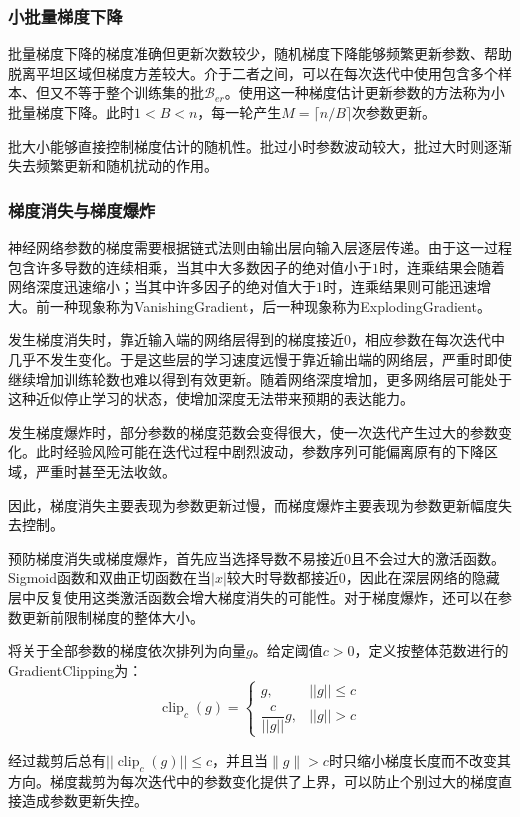 \subsubsection{小批量梯度下降}
批量梯度下降的梯度准确但更新次数较少，随机梯度下降能够频繁更新参数、帮助脱离平坦区域但梯度方差较大。介于二者之间，可以在每次迭代中使用包含多个样本、但又不等于整个训练集的批$\mathcal{B}_{er}$。使用这一种梯度估计更新参数的方法称为小批量梯度下降。此时$1<B<n$，每一轮产生$M=\lceil n/B\rceil$次参数更新。\par
批大小能够直接控制梯度估计的随机性。批过小时参数波动较大，批过大时则逐渐失去频繁更新和随机扰动的作用。
\subsubsection{梯度消失与梯度爆炸}
神经网络参数的梯度需要根据链式法则由输出层向输入层逐层传递。由于这一过程包含许多导数的连续相乘，当其中大多数因子的绝对值小于$1$时，连乘结果会随着网络深度迅速缩小；当其中许多因子的绝对值大于$1$时，连乘结果则可能迅速增大。前一种现象称为\gls{VanishingGradient}，后一种现象称为\gls{ExplodingGradient}。\par
发生梯度消失时，靠近输入端的网络层得到的梯度接近$0$，相应参数在每次迭代中几乎不发生变化。于是这些层的学习速度远慢于靠近输出端的网络层，严重时即使继续增加训练轮数也难以得到有效更新。随着网络深度增加，更多网络层可能处于这种近似停止学习的状态，使增加深度无法带来预期的表达能力。\par
发生梯度爆炸时，部分参数的梯度范数会变得很大，使一次迭代产生过大的参数变化。此时经验风险可能在迭代过程中剧烈波动，参数序列可能偏离原有的下降区域，严重时甚至无法收敛。\par
因此，梯度消失主要表现为参数更新过慢，而梯度爆炸主要表现为参数更新幅度失去控制。\par
预防梯度消失或梯度爆炸，首先应当选择导数不易接近$0$且不会过大的激活函数。Sigmoid函数和双曲正切函数在当$|x|$较大时导数都接近$0$，因此在深层网络的隐藏层中反复使用这类激活函数会增大梯度消失的可能性。对于梯度爆炸，还可以在参数更新前限制梯度的整体大小。
\begin{definition}
	将关于全部参数的梯度依次排列为向量$g$。给定阈值$c>0$，定义按整体范数进行的\gls{GradientClipping}为：
	\begin{equation*}
		\operatorname{clip}_c(g)=
		\begin{cases}
			g,&||g||\leqslant c \\
			\dfrac{c}{||g||}g,&||g||>c
		\end{cases}
	\end{equation*}
\end{definition}
经过裁剪后总有$||\operatorname{clip}_c(g)||\leqslant c$，并且当$\|g\|>c$时只缩小梯度长度而不改变其方向。梯度裁剪为每次迭代中的参数变化提供了上界，可以防止个别过大的梯度直接造成参数更新失控。

